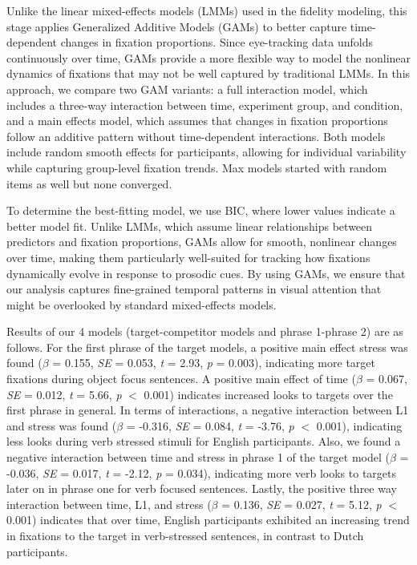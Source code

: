 Unlike the linear mixed-effects models (LMMs) used in the fidelity modeling, this stage applies Generalized Additive Models (GAMs) to better capture time-dependent changes in fixation proportions. Since eye-tracking data unfolds continuously over time, GAMs provide a more flexible way to model the nonlinear dynamics of fixations that may not be well captured by traditional LMMs. In this approach, we compare two GAM variants: a full interaction model, which includes a three-way interaction between time, experiment group, and condition, and a main effects model, which assumes that changes in fixation proportions follow an additive pattern without time-dependent interactions. Both models include random smooth effects for participants, allowing for individual variability while capturing group-level fixation trends. Max models started with random items as well but none converged.

To determine the best-fitting model, we use BIC, where lower values indicate a better model fit. Unlike LMMs, which assume linear relationships between predictors and fixation proportions, GAMs allow for smooth, nonlinear changes over time, making them particularly well-suited for tracking how fixations dynamically evolve in response to prosodic cues. By using GAMs, we ensure that our analysis captures fine-grained temporal patterns in visual attention that might be overlooked by standard mixed-effects models.

Results of our 4 models (target-competitor models and phrase 1-phrase 2) are as follows. For the first phrase of the target models, a positive main effect stress was found ($\beta$ = 0.155, \textit{SE} = 0.053, \textit{t} = 2.93, \textit{p} = 0.003), indicating more target fixations during object focus sentences. A positive main effect of time ($\beta$ = 0.067, \textit{SE} = 0.012, \textit{t} = 5.66, \textit{p} $<$ 0.001)
 indicates increased looks to targets over the first phrase in general. In terms of interactions, a negative interaction between L1 and stress was found ($\beta$ = -0.316, \textit{SE} = 0.084, \textit{t} = -3.76, \textit{p} $<$ 0.001), indicating less looks during verb stressed stimuli for English participants. Also, we found a negative interaction between time and stress in phrase 1 of the target model ($\beta$ = -0.036, \textit{SE} = 0.017, \textit{t} = -2.12, \textit{p} = 0.034), indicating more verb looks to targets later on in phrase one for verb focused sentences. Lastly, the positive three way interaction between time, L1, and stress ($\beta$ = 0.136, \textit{SE} = 0.027, \textit{t} = 5.12, \textit{p} $<$ 0.001) indicates that over time, English participants exhibited an increasing trend in fixations to the target in verb-stressed sentences, in contrast to Dutch participants.
 
